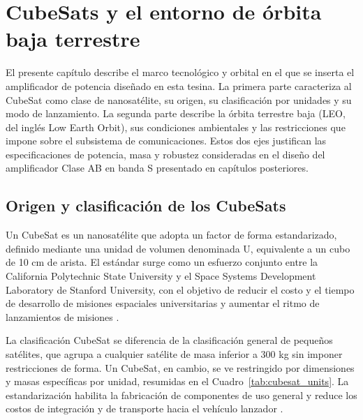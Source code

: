 \chapter{CubeSats y el entorno de órbita baja terrestre} \label{chap:cubesat_leo}
El presente capítulo describe el marco tecnológico y orbital en el que se inserta el amplificador de potencia diseñado en esta tesina. La primera parte caracteriza al CubeSat como clase de nanosatélite, su origen, su clasificación por unidades y su modo de lanzamiento. La segunda parte describe la órbita terrestre baja (LEO, del inglés Low Earth Orbit), sus condiciones ambientales y las restricciones que impone sobre el subsistema de comunicaciones. Estos dos ejes justifican las especificaciones de potencia, masa y robustez consideradas en el diseño del amplificador Clase AB en banda S presentado en capítulos posteriores.

\section{Origen y clasificación de los CubeSats}
Un CubeSat es un nanosatélite que adopta un factor de forma estandarizado, definido mediante una unidad de volumen denominada U, equivalente a un cubo de 10 cm de arista. El estándar surge como un esfuerzo conjunto entre la California Polytechnic State University y el Space Systems Development Laboratory de Stanford University, con el objetivo de reducir el costo y el tiempo de desarrollo de misiones espaciales universitarias y aumentar el ritmo de lanzamientos de misiones \cite{cubesatspecs}.

La clasificación CubeSat se diferencia de la clasificación general de pequeños satélites, que agrupa a cualquier satélite de masa inferior a 300 kg sin imponer restricciones de forma. Un CubeSat, en cambio, se ve restringido por dimensiones y masas específicas por unidad, resumidas en el Cuadro~\ref{tab:cubesat_units}. La estandarización habilita la fabricación de componentes de uso general y reduce los costos de integración y de transporte hacia el vehículo lanzador \cite{nasa2017}.

